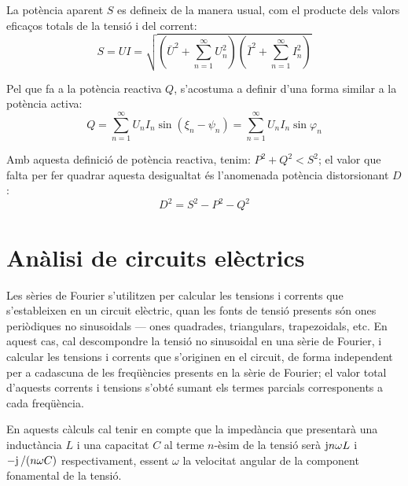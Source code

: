 La potència aparent $S$ es defineix de la manera usual, com el
producte dels valors eficaços totals de la tensió i del corrent:
\begin{equation}
    S = U I = \sqrt{ \left(\bar{U}^2 + \sum_{n=1}^{\infty}U^2_n\right)
    \left(\bar{I}^2 + \sum_{n=1}^{\infty}I^2_n\right) }
\end{equation}

Pel que fa  a la potència reactiva $Q$, s'acostuma  a definir d'una
forma similar a la potència activa:
\begin{equation}
    Q = \sum_{n=1}^\infty U_n I_n
    \sin(\xi_n-\psi_n) =  \sum_{n=1}^\infty U_n I_n
    \sin \varphi_n
\end{equation}

Amb aquesta definició de potència reactiva, tenim: $P^2+Q^2 < S^2$;
el valor que falta per fer quadrar aquesta desigualtat és l'anomenada
potència distorsionant $D$:
\begin{equation}
    D^2 = S^2 - P^2 - Q^2
\end{equation}

\section{Anàlisi de circuits elèctrics}

Les sèries de Fourier s'utilitzen per calcular les tensions i
corrents que s'estableixen en un circuit elèctric, quan les fonts de
tensió presents  són ones periòdiques no sinusoidals --- ones
quadrades, triangulars, trapezoidals, etc. En aquest cas, cal
descompondre la tensió no sinusoidal en una sèrie de Fourier, i
calcular les tensions i corrents que s'originen en el circuit, de
forma independent per a cadascuna de les freqüències presents en la
sèrie de Fourier; el valor total d'aquests corrents i tensions
s'obté sumant els termes parcials corresponents a cada freqüència.

En aquests càlculs cal tenir en compte que la impedància que
presentarà una inductància $L$ i una capacitat $C$ al terme
$n$-èsim de la tensió serà $\mathrm{j} n \omega L$ i $-\mathrm{j}\,/(n\omega C)$
respectivament, essent $\omega$ la velocitat angular de la component
fonamental de la tensió.


